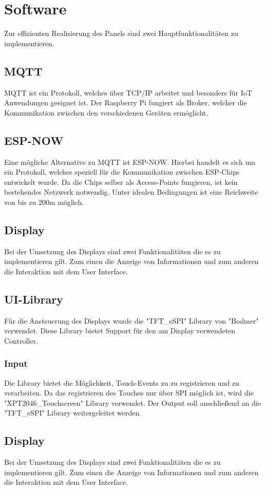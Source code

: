         \section{Software}
        Zur effizienten Realisierung des Panels sind zwei 
        Hauptfunktionalitäten zu implementieren.

            \subsection{MQTT}
            MQTT ist ein Protokoll, welches über TCP/IP arbeitet
            und besonders für IoT Anwendungen geeignet ist. Der 
            Raspberry Pi fungiert als Broker, welcher die
            Kommunikation zwischen den verschiedenen Geräten
            ermöglicht.

            

            \subsection{ESP-NOW}
            Eine mögliche Alternative zu MQTT ist ESP-NOW.
            Hierbei handelt es sich um ein Protokoll, welches
            speziell für die Kommunikation zwischen ESP-Chips
            entwickelt wurde. Da die Chips selber als Access-Points
            fungieren, ist kein bestehendes Netzwerk notwendig. Unter 
            idealen Bedingungen ist eine Reichweite von bis zu 200m 
            möglich.
            
            \subsection{Display}
            Bei der Umsetzung des Displays sind zwei Funktionalitäten
            die es zu implementieren gilt. Zum einen die Anzeige von
            Informationen und zum anderen die Interaktion mit dem
            User Interface. 
            \subsection{UI-Library}
            Für die Ansteuerung des Displays wurde die "TFT\_eSPI"
            \space Library von "Bodmer" verwendet. Diese Library bietet
            Support für den am Display verwendeten Controller.
            
                \subsubsection{Input}
                Die Library bietet die Möglichkeit, Touch-Events zu
                zu registrieren und zu verarbeiten. Da das registrieren
                des Touches nur über SPI möglich ist, wird die
                "XPT2046\_Touchscreen" Library verwendet. Der Output
                soll anschließend an die "TFT\_eSPI" Library weitergeleitet
                werden.

            \subsection{Display}
            Bei der Umsetzung des Displays sind zwei Funktionalitäten
            die es zu implementieren gilt. Zum einen die Anzeige von
            Informationen und zum anderen die Interaktion mit dem
            User Interface. 
        